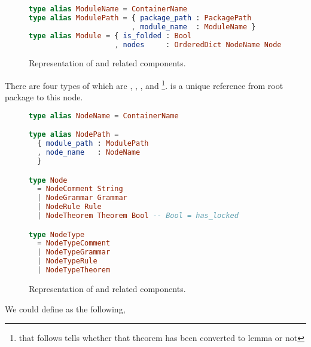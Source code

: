 \documentclass[master.tex]{subfiles}
\begin{document}
\begin{figure}[H]
\begin{framed}
\begin{lstlisting}[language=elm]
type alias ModuleName = ContainerName
type alias ModulePath = { package_path : PackagePath
                        , module_name  : ModuleName }
type alias Module = { is_folded : Bool
                    , nodes     : OrderedDict NodeName Node }
\end{lstlisting}
\end{framed}
\caption{Representation of  and related components.}
\label{fig:implementation-repo-module}
\end{figure}

There are four types of  which are , ,
, and \footnote{ that follows
   tells whether that theorem has been converted to lemma or
  not}.  is a unique reference from root package to this
node.

\begin{figure}[H]
\begin{framed}
\begin{lstlisting}[language=elm]
type alias NodeName = ContainerName

type alias NodePath =
  { module_path : ModulePath
  , node_name   : NodeName
  }

type Node
  = NodeComment String
  | NodeGrammar Grammar
  | NodeRule Rule
  | NodeTheorem Theorem Bool -- Bool = has_locked

type NodeType
  = NodeTypeComment
  | NodeTypeGrammar
  | NodeTypeRule
  | NodeTypeTheorem
\end{lstlisting}
\end{framed}
\caption{Representation of  and related components.}
\label{fig:implementation-repo-node}
\end{figure}

We could define  as the following,
\end{document}
